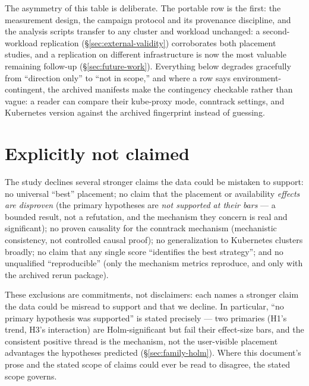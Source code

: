 The asymmetry of this table is deliberate. The portable row is the first: the
measurement design, the campaign protocol and its provenance discipline, and the
analysis scripts transfer to any cluster and workload unchanged: a second-workload
replication (\S\ref{sec:external-validity}) corroborates both placement studies,
and a replication on different infrastructure is now the most valuable remaining
follow-up (\S\ref{sec:future-work}). Everything below
degrades gracefully from ``direction only'' to ``not in scope,'' and where a row
says environment-contingent, the archived manifests make the contingency
checkable rather than vague: a reader can compare their kube-proxy mode,
conntrack settings, and Kubernetes version against the archived fingerprint
instead of guessing.

\section{Explicitly not claimed}\label{sec:not-claimed}

The study declines several stronger claims the data could be mistaken to
support: no universal ``best'' placement; no claim that the placement or
availability \emph{effects are disproven} (the primary hypotheses are
\emph{not supported at their bars} --- a bounded result, not a
refutation, and the mechanism they concern is real and significant); no proven
causality for the conntrack mechanism (mechanistic consistency, not controlled
causal proof); no generalization to Kubernetes clusters broadly; no claim that
any single score ``identifies the best strategy''; and no unqualified
``reproducible'' (only the mechanism metrics reproduce, and only with the
archived rerun package).

These exclusions are commitments, not disclaimers: each names a stronger claim
the data could be misread to support and that we decline. In particular, ``no
primary hypothesis was supported'' is stated precisely --- two primaries
(H1's trend, H3's interaction) are Holm-significant but fail their
effect-size bars, and the consistent positive thread is the mechanism, not the
user-visible placement advantages the hypotheses predicted (\S\ref{sec:family-holm}).
Where this document's prose and the stated scope of claims could ever be read to
disagree, the stated scope governs.
